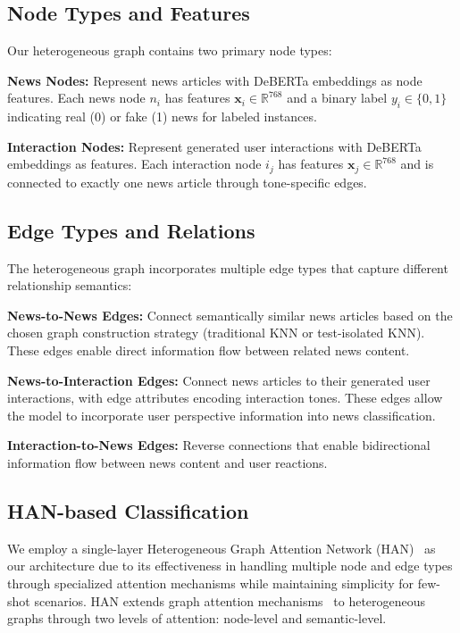 \subsection{Node Types and Features}

Our heterogeneous graph contains two primary node types:

\textbf{News Nodes:} Represent news articles with DeBERTa embeddings as node features. Each news node $n_i$ has features $\mathbf{x}_i \in \mathbb{R}^{768}$ and a binary label $y_i \in \{0, 1\}$ indicating real (0) or fake (1) news for labeled instances.

\textbf{Interaction Nodes:} Represent generated user interactions with DeBERTa embeddings as features. Each interaction node $i_j$ has features $\mathbf{x}_j \in \mathbb{R}^{768}$ and is connected to exactly one news article through tone-specific edges.

\subsection{Edge Types and Relations}

The heterogeneous graph incorporates multiple edge types that capture different relationship semantics:

\textbf{News-to-News Edges:} Connect semantically similar news articles based on the chosen graph construction strategy (traditional KNN or test-isolated KNN). These edges enable direct information flow between related news content.

\textbf{News-to-Interaction Edges:} Connect news articles to their generated user interactions, with edge attributes encoding interaction tones. These edges allow the model to incorporate user perspective information into news classification.

\textbf{Interaction-to-News Edges:} Reverse connections that enable bidirectional information flow between news content and user reactions.

\subsection{HAN-based Classification}

We employ a single-layer Heterogeneous Graph Attention Network (HAN)~\cite{wang2019han} as our architecture due to its effectiveness in handling multiple node and edge types through specialized attention mechanisms while maintaining simplicity for few-shot scenarios. HAN extends graph attention mechanisms~\cite{veličković2018graph} to heterogeneous graphs through two levels of attention: node-level and semantic-level.


